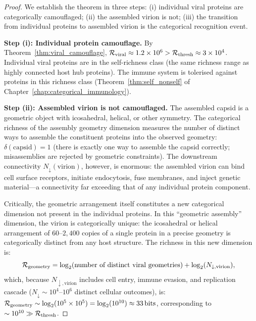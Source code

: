 \begin{proof}
We establish the theorem in three steps: (i) individual viral proteins are
categorically camouflaged; (ii) the assembled virion is not; (iii) the
transition from individual proteins to assembled virion is the categorical
recognition event.

\textbf{Step (i): Individual protein camouflage.}
By Theorem~\ref{thm:viral_camouflage}, $\mathcal{R}_{\mathrm{viral}} \approx 1.2 \times 10^6
> \mathcal{R}_{\mathrm{thresh}} \approx 3 \times 10^4$. Individual viral proteins
are in the self-richness class (the same richness range as highly connected
host hub proteins). The immune system is tolerised against proteins in this
richness class (Theorem~\ref{thm:self_nonself} of Chapter~\ref{chap:categorical_immunology}).

\textbf{Step (ii): Assembled virion is not camouflaged.}
The assembled capsid is a geometric object with icosahedral, helical, or other
symmetry. The categorical richness of the assembly geometry dimension measures
the number of distinct ways to assemble the constituent proteins into the
observed geometry: $\delta(\mathrm{capsid}) = 1$ (there is exactly one way
to assemble the capsid correctly; misassemblies are rejected by geometric
constraints). The downstream connectivity $N_{\downarrow}(\mathrm{virion})$,
however, is enormous: the assembled virion can bind cell surface receptors,
initiate endocytosis, fuse membranes, and inject genetic material---a
connectivity far exceeding that of any individual protein component.

Critically, the geometric arrangement itself constitutes a new categorical
dimension not present in the individual proteins. In this ``geometric assembly''
dimension, the virion is categorically unique: the icosahedral or helical
arrangement of $60$--$2{,}400$ copies of a single protein in a precise geometry
is categorically distinct from any host structure. The richness in this new
dimension is:
\begin{equation}
  \mathcal{R}_{\mathrm{geometry}} = \log_2(\text{number of distinct viral geometries}) + \log_2(N_{\downarrow, \mathrm{virion}}),
\end{equation}
which, because $N_{\downarrow, \mathrm{virion}}$ includes cell entry, immune
evasion, and replication cascade ($N_{\downarrow} \sim 10^4$--$10^6$ distinct
cellular outcomes), is:
$\mathcal{R}_{\mathrm{geometry}} \sim \log_2(10^5 \times 10^5) = \log_2(10^{10}) \approx 33\,\mathrm{bits}$,
corresponding to $\sim 10^{10} \gg \mathcal{R}_{\mathrm{thresh}}$.


\end{proof}
